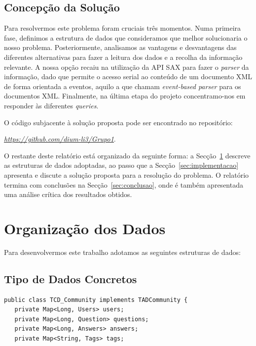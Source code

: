 \documentclass[a4paper]{article}
\begin{document}
\subsection{Concepção da Solução}
\label{sec:solucao}

Para resolvermos este problema foram cruciais três momentos. Numa primeira fase,
definimos a estrutura de dados que consideramos que melhor solucionaria o nosso
problema. Posteriormente, analisamos as vantagens e desvantagens das diferentes
alternativas para fazer a leitura dos dados e a recolha da informação relevante.
A nossa opção recaiu na utilização da API SAX para fazer o \textit{parser} da
informação, dado que permite o acesso serial ao conteúdo de um documento XML de
forma orientada a eventos, aquilo a que chamam \textit{event-based parser} para
os documentos XML.
Finalmente, na última etapa do projeto concentramo-nos em responder
às diferentes \textit{queries}.

O código subjacente à solução proposta pode ser encontrado no repositório:

\begin{center}
\href{https://github.com/dium-li3/Grupo1}{\emph{https://github.com/dium-li3/Grupo1}}.
\end{center}

O restante deste relatório está organizado da seguinte forma: a
Secção~\ref{sec:estruturadedados} descreve as estruturas de dados adoptadas,
ao passo que a Secção~\ref{sec:implementacao}  apresenta e discute a solução
proposta para a resolução do problema. O relatório termina com conclusões na
Secção~\ref{sec:conclusao}, onde é também apresentada uma análise crítica dos
resultados obtidos.



\section{Organização dos Dados}
\label{sec:estruturadedados}

Para desenvolvermos este trabalho adotamos as seguintes estruturas de dados:

\subsection{Tipo de Dados Concretos}
\label{sec:dados_concretos}

\begin{verbatim}
public class TCD_Community implements TADCommunity {
   private Map<Long, Users> users;
   private Map<Long, Question> questions;
   private Map<Long, Answers> answers;
   private Map<String, Tags> tags;
\end{verbatim}
\end{document}

